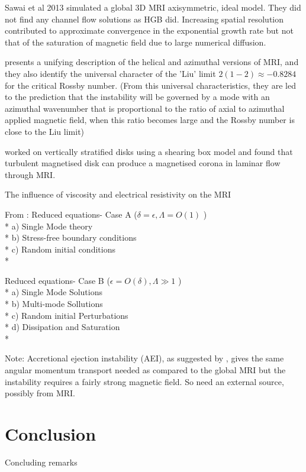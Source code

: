 \documentclass{jfm}
\begin{document}
Sawai et al 2013 \cite{Sawai2013} simulated a global 3D MRI axisymmetric, ideal
model. They did not find any channel flow solutions as HGB did. Increasing 
spatial resolution contributed to approximate convergence in the exponential 
growth rate but not that of the saturation of magnetic field due to large 
numerical diffusion.

\cite{Kirillov2012} presents a unifying description of the helical and 
azimuthal versions of MRI, and they also identify the universal character of
the 'Liu' limit $2(1 - 2) \approx - 0.8284$ for the critical Rossby number. 
(From this universal characteristics, they are led to the prediction that the
instability will be governed by a mode with an azimuthal wavenumber that is 
proportional to the ratio of axial to azimuthal applied magnetic field, when
this ratio becomes large and the Rossby number is close to the Liu limit)

\cite{Miller1999} worked on vertically stratified disks using a shearing box
model and found that turbulent magnetised disk can produce a magnetised corona
in laminar flow through MRI.

The influence of viscosity and electrical resistivity on the MRI 
\citep[see][]{Pessah2008}
  
From \cite{Julien2010}: Reduced equations- Case A ($ \delta = \epsilon, \Lambda = O(1) $ )\\*
 a) Single Mode theory \\*
 b) Stress-free boundary conditions \\*
 c) Random initial conditions \\*
 
 Reduced equations- Case B ($  \epsilon =O( \delta), \Lambda \gg 1 $ ) \\*
 a) Single Mode Solutions \\*
 b) Multi-mode Sollutions \\*
 c) Random initial Perturbations \\*
 d) Dissipation and Saturation \\*
 
Note: Accretional ejection instability (AEI), as suggested by \cite{Caunt2011},
gives the same angular momentum transport needed as compared to the global MRI
but the instability requires a fairly strong magnetic field. So need an 
external source, possibly from MRI.



\section{Conclusion}
Concluding remarks





\end{document}
